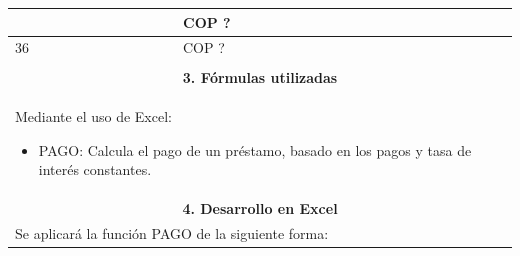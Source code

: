 \begin{center}
\begin{longtable}[H]{|p{0.333\linewidth}|p{0.3333\linewidth}|p{0.3333\linewidth}|}
{\begin{center}
\begin{tabular}{ |p{3.5cm}| p{3cm}|}
    35                      &  COP ?            \\ \hline
    36                      &  COP ?            \\ \hline
   \end{tabular}
  \end{center}
  }                                                                                              \\ \hline
  \multicolumn{3}{|c|}{\cellcolor[HTML]{FFB183}\textbf{3. Fórmulas utilizadas}}                  \\ \hline
  \multicolumn{3}{|p{\columnwidth}|}{Mediante el uso de Excel:
  \begin{itemize}
   \item PAGO: Calcula el pago de un préstamo, basado en los pagos y tasa de interés
         constantes.
  \end{itemize}
  }                                                                                              \\ \hline
  \multicolumn{3}{|c|}{\cellcolor[HTML]{FFB183}\textbf{4. Desarrollo en Excel}}                  \\ \hline
  \multicolumn{3}{|p{\columnwidth}|}{
  Se aplicará la función PAGO de la siguiente forma:

}
\end{longtable}
\end{center}
